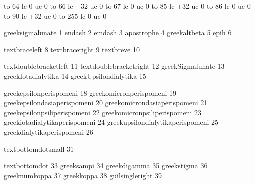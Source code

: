 
\startmapping[agr]

     to  64 lc   0 uc 0
     to  66 lc +32 uc 0
     to  67 lc   0 uc 0
     to  85 lc +32 uc 0
     to  86 lc   0 uc 0
     to  90 lc +32 uc 0
     to 255 lc   0 uc 0

\stopmapping

\startencoding[agr]

 greeksigmalunate                    1
 endash                              2
 emdash                              3
 apostrophe                          4
 greekaltbeta                        5
 epih                                6

 textbraceleft                       8
 textbraceright                      9
 textbreve                          10

 textdoublebracketleft              11
 textdoublebracketright             12
 greekSigmalunate                   13
 greekIotadialytika                 14
 greekUpsilondialytika              15

 greekepsilonperispomeni            18
 greekomicronperispomeni            19
 greekepsilondasiaperispomeni       20
 greekomicrondasiaperispomeni       21
 greekepsilonpsiliperispomeni       22
 greekomicronpsiliperispomeni       23
 greekiotadialytikaperispomeni      24
 greekupsilondialytikaperispomeni   25
 greekdialytikaperispomeni          26

 textbottomdotsmall                 31

 textbottomdot                      33
 greeksampi                         34
 greekdigamma                       35
 greekstigma                        36
 greeknumkoppa                      37
 greekkoppa                         38
 guilsingleright                    39

